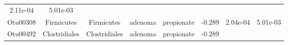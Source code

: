 \documentclass[11pt,]{article}
\begin{document}
\begin{longtable}[]{@{}cccccccc@{}}
\begin{minipage}[t]{0.08\columnwidth}
2.11e-04\strut
\end{minipage} & \begin{minipage}[t]{0.08\columnwidth}\centering\strut
5.01e-03\strut
\end{minipage}\tabularnewline
\begin{minipage}[t]{0.08\columnwidth}\centering\strut
Otu00308\strut
\end{minipage} & \begin{minipage}[t]{0.15\columnwidth}\centering\strut
Firmicutes\strut
\end{minipage} & \begin{minipage}[t]{0.15\columnwidth}\centering\strut
Firmicutes\strut
\end{minipage} & \begin{minipage}[t]{0.08\columnwidth}\centering\strut
adenoma\strut
\end{minipage} & \begin{minipage}[t]{0.09\columnwidth}\centering\strut
propionate\strut
\end{minipage} & \begin{minipage}[t]{0.07\columnwidth}\centering\strut
-0.289\strut
\end{minipage} & \begin{minipage}[t]{0.08\columnwidth}\centering\strut
2.04e-04\strut
\end{minipage} & \begin{minipage}[t]{0.08\columnwidth}\centering\strut
5.01e-03\strut
\end{minipage}\tabularnewline
\begin{minipage}[t]{0.08\columnwidth}\centering\strut
Otu00492\strut
\end{minipage} & \begin{minipage}[t]{0.15\columnwidth}\centering\strut
Clostridiales\strut
\end{minipage} & \begin{minipage}[t]{0.15\columnwidth}\centering\strut
Clostridiales\strut
\end{minipage} & \begin{minipage}[t]{0.08\columnwidth}\centering\strut
adenoma\strut
\end{minipage} & \begin{minipage}[t]{0.09\columnwidth}\centering\strut
propionate\strut
\end{minipage} & \begin{minipage}[t]{0.07\columnwidth}\centering\strut
-0.289\strut
\end{minipage} & \begin{minipage}[t]{0.08\columnwidth}\centering\strut

\end{minipage}
\end{longtable}
\end{document}
